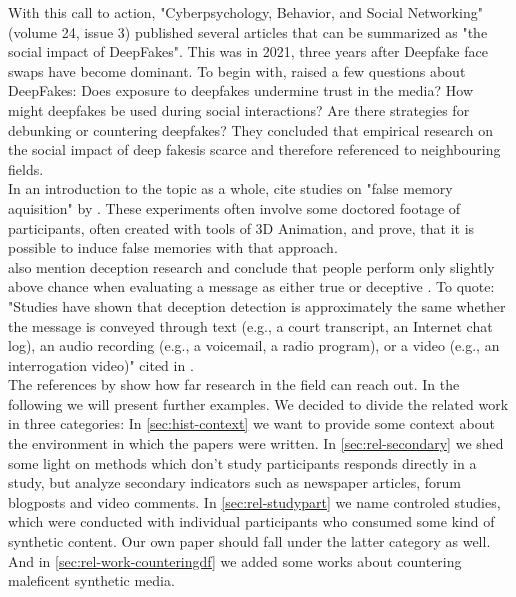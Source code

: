 \documentclass[
  a4paper,  %
  twoside,  %
  bibliography=totoc,
  headsepline,
  cleardoublepage=empty,
  parskip=half,
  draft=false
]{scrbook}
\begin{document}
With this call to action, "Cyberpsychology, Behavior, and Social Networking" (volume 24, issue 3) published several articles that can be summarized as "the social impact of DeepFakes". This was in 2021, three years after Deepfake face swaps have become dominant. To begin with, \citet{hancockSocialImpactDeepfakes2021} raised a few questions about DeepFakes: Does exposure to deepfakes undermine trust in the media? How might deepfakes be used during social interactions? Are there strategies for debunking or countering deepfakes? They concluded that empirical research on the social impact of deep fakesis scarce and therefore referenced to neighbouring fields. \\
In an introduction to the topic as a whole, \citet{hancockSocialImpactDeepfakes2021} cite studies on "false memory aquisition" by \citet{garryActuallyPictureWorth2005}. These experiments often involve some doctored footage of participants, often created with tools of 3D Animation, and prove, that it is possible to induce false memories with that approach. \\
\citet{hancockSocialImpactDeepfakes2021} also mention deception research and conclude that people perform only slightly above chance when evaluating a message as either true or deceptive \cite{bondAccuracyDeceptionJudgments2006}. To quote: "Studies have shown that deception detection is approximately the same whether the message is conveyed through text (e.g., a court transcript, an Internet chat log), an audio recording (e.g., a voicemail, a radio program), or a video (e.g., an interrogation video)" \cite{hancockSeeNoEvil2010} cited in \cite{hancockSocialImpactDeepfakes2021}. \\
The references by \citet{hancockSocialImpactDeepfakes2021} show how far research in the field can reach out. In the following we will present further examples. We decided to divide the related work in three categories: In \ref{sec:hist-context} we want to provide some context about the environment in which the papers were written. In \ref{sec:rel-secondary} we shed some light on methods which don't study participants responds directly in a study, but analyze secondary indicators such as newspaper articles, forum blogposts and video comments. In \ref{sec:rel-studypart} we name controled studies, which were conducted with individual participants who consumed some kind of synthetic content. Our own paper should fall under the latter category as well. And in \ref{sec:rel-work-counteringdf} we added some works about countering maleficent synthetic media.
\end{document}
